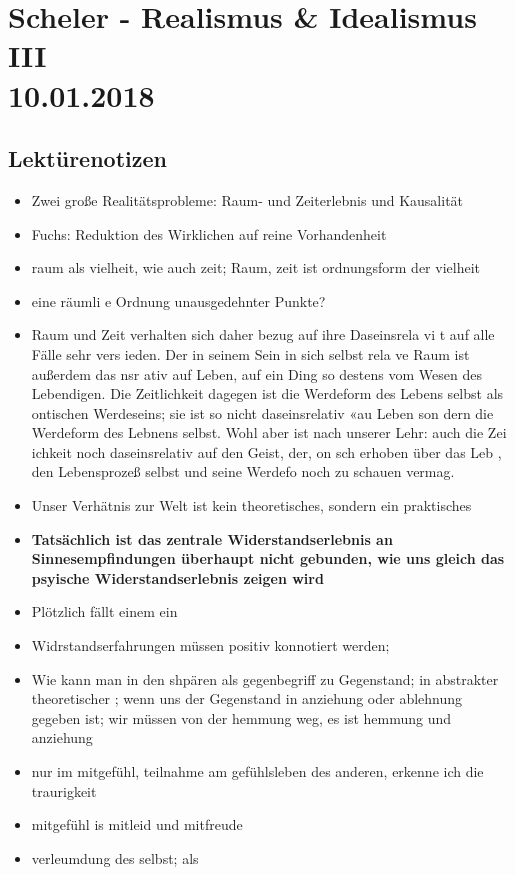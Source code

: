 \documentclass[emulatestandardclasses]{scrartcl}
\begin{document}
\section{Scheler - Realismus \& Idealismus III\\10.01.2018}

\subsection{Lektürenotizen}

\begin{itemize}
  \item Zwei große Realitätsprobleme: Raum- und Zeiterlebnis und Kausalität
  \item Fuchs: Reduktion des Wirklichen auf reine Vorhandenheit 
  \item raum als vielheit, wie auch zeit; Raum, zeit ist ordnungsform der vielheit
  \item eine räumli e Ordnung unausgedehnter Punkte?
  \item Raum und Zeit verhalten sich daher   bezug auf ihre Daseinsrela vi t auf alle Fälle sehr vers ieden. Der in seinem Sein in sich selbst rela ve Raum ist außerdem das nsr ativ auf Leben, auf ein Ding  so  destens vom Wesen des Lebendigen. Die Zeitlichkeit dagegen ist die Werdeform des Lebens
selbst als ontischen Werdeseins; sie ist  so nicht daseinsrelativ «au  Leben son­ dern die Werdeform des Lebnens selbst. Wohl aber ist nach unserer Lehr: auch die Zei ichkeit noch daseinsrelativ auf den Geist, der, on sch erhoben über das Leb , den Lebensprozeß selbst und seine Werdefo  noch zu schauen vermag.
  \item Unser Verhätnis zur Welt ist kein theoretisches, sondern ein praktisches
  \item \textbf{Tatsächlich ist das zentrale Widerstandserlebnis an Sinnesempfindungen überhaupt nicht gebun­den, wie uns gleich das psyische Widerstandserlebnis zeigen wird}
  \item Plötzlich fällt einem ein
  \item Widrstandserfahrungen müssen positiv konnotiert werden; 
  \item Wie kann man in den shpären als gegenbegriff zu Gegenstand; in abstrakter theoretischer ; wenn uns der Gegenstand in anziehung oder ablehnung gegeben ist; wir müssen von der hemmung weg, es ist hemmung und anziehung
  \item nur im mitgefühl, teilnahme am gefühlsleben des anderen, erkenne ich die traurigkeit
  \item mitgefühl is mitleid und mitfreude
  \item verleumdung des selbst; als 

\end{itemize}
\end{document}
